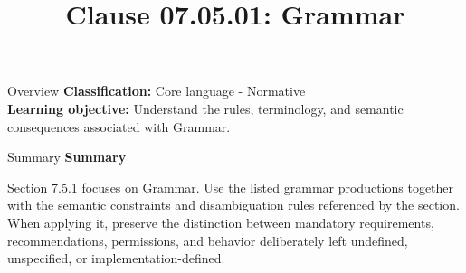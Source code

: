 \documentclass[10pt,letterpaper]{article}
\title{Clause 07.05.01: Grammar}
\author{}
\date{}
\begin{document}
\maketitle
\begin{CornellOverviewBox}{Overview}
\textbf{Classification:} Core language - Normative\\[2pt]
\textbf{Learning objective:} Understand the rules, terminology, and semantic consequences associated with Grammar.
\end{CornellOverviewBox}\begin{CornellSummaryBox}{Summary}
{\sffamily\bfseries\color{Accent} Summary}\par\vspace{3pt}Section 7.5.1 focuses on Grammar. Use the listed grammar productions together with the semantic constraints and disambiguation rules referenced by the section. When applying it, preserve the distinction between mandatory requirements, recommendations, permissions, and behavior deliberately left undefined, unspecified, or implementation-defined.
\end{CornellSummaryBox}
\end{document}
